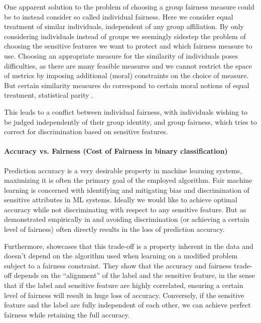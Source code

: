 	One apparent solution to the problem of choosing a group fairness measure could be to instead consider so called individual fairness.
	Here we consider equal treatment of similar individuals, independent of any group affiliation.
	By only considering individuals instead of groups we seemingly sidestep the problem of choosing the sensitive features we want to protect and which fairness measure to use.
	Choosing an appropriate measure for the similarity of individuals poses difficulties, as there are many feasible measures and we cannot restrict the space of metrics by imposing additional (moral) constraints on the choice of measure.
	But certain similarity measures do correspond to certain moral notions of equal treatment, \eg statistical parity \cite{dwork2012fairness}.

    This leads to a conflict between individual fairness, with individuals wishing to be judged independently of their group identity, and group fairness, which tries to correct for discrimination based on sensitive features.

	\paragraph{Accuracy vs. Fairness (Cost of Fairness in binary classification)}
	Prediction accuracy is a very desirable property in machine learning systems, maximizing it is often the primary goal of the employed algorithm.
	Fair machine learning is concerned with identifying and mitigating bias and discrimination of sensitive attributes in ML systems.
	Ideally we would like to achieve optimal accuracy while not discriminating with respect to any sensitive feature.
	But as demonstrated empirically in \eg \cite{kamiran2010discrimination} and \cite{zliobaite2015relation} avoiding discrimination (or achieving a certain level of fairness) often directly results in the loss of prediction accuracy.

	Furthermore, \cite{menon2018cost} showcases that this trade-off is a property inherent in the data and doesn't depend on the algorithm used when learning on a modified problem subject to a fairness constraint.
	They show that the accuracy and fairness trade-off depends on the \enquote{alignment} of the label and the sensitive feature, in the sense that if the label and sensitive feature are highly correlated, ensuring a certain level of fairness will result in huge loss of accuracy.
	Conversely, if the sensitive feature and the label are fully independent of each other, we can achieve perfect fairness while retaining the full accuracy.

